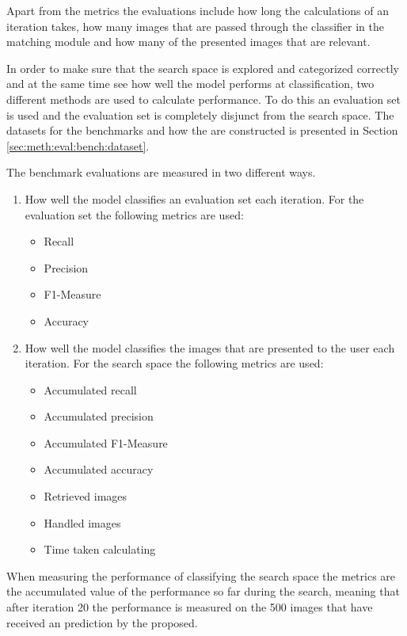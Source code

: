 Apart from the metrics the evaluations include how long the calculations of an iteration takes, how many images that are passed through the classifier in the matching module and how many of the presented images that are relevant.   

In order to make sure that the search space is explored and categorized correctly and at the same time see how well the model performs at classification, two different methods are used to calculate performance. To do this an evaluation set is used and the evaluation set is completely disjunct from the search space. The datasets for the benchmarks and how the are constructed is presented in Section \ref{sec:meth:eval:bench:dataset}. 

The benchmark evaluations are measured in two different ways.
\begin{enumerate}
\item How well the model classifies an evaluation set each iteration. For the evaluation set the following metrics are used: 
	\begin{itemize}
		\item Recall
		\item Precision
		\item F1-Measure
		\item Accuracy
	\end{itemize}   
\item How well the model classifies the images that are presented to the user each iteration. For the search space the following metrics are used:
	\begin{itemize}
		\item Accumulated recall 
		\item Accumulated precision
		\item Accumulated F1-Measure
		\item Accumulated accuracy
		\item Retrieved images
		\item Handled images
		\item Time taken calculating
	\end{itemize}   
\end{enumerate}
\medskip
When measuring the performance of classifying the search space the metrics are the accumulated value of the performance so far during the search, meaning that after iteration 20 the performance is measured on the 500 images that have received an prediction by the proposed.

